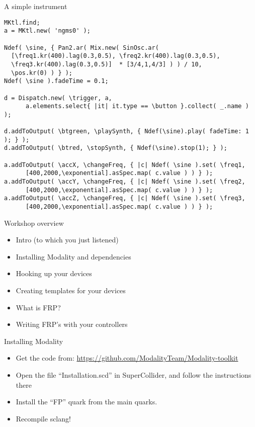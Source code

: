 \documentclass[pdf,slideColor,colorBG,accumulate,total]{prosper}
\begin{document}
\begin{slide}{A simple instrument}
 
 \scriptsize
 \begin{verbatim}
MKtl.find;
a = MKtl.new( 'ngms0' );

Ndef( \sine, { Pan2.ar( Mix.new( SinOsc.ar( 
  [\freq1.kr(400).lag(0.3,0.5), \freq2.kr(400).lag(0.3,0.5), 
  \freq3.kr(400).lag(0.3,0.5)]  * [3/4,1,4/3] ) ) / 10,
  \pos.kr(0) ) } );
Ndef( \sine ).fadeTime = 0.1;

d = Dispatch.new( \trigger, a, 
      a.elements.select{ |it| it.type == \button }.collect( _.name ) );

d.addToOutput( \btgreen, \playSynth, { Ndef(\sine).play( fadeTime: 1 ); } );
d.addToOutput( \btred, \stopSynth, { Ndef(\sine).stop(1); } );

a.addToOutput( \accX, \changeFreq, { |c| Ndef( \sine ).set( \freq1, 
      [400,2000,\exponential].asSpec.map( c.value ) ) } );
a.addToOutput( \accY, \changeFreq, { |c| Ndef( \sine ).set( \freq2, 
      [400,2000,\exponential].asSpec.map( c.value ) ) } );
a.addToOutput( \accZ, \changeFreq, { |c| Ndef( \sine ).set( \freq3, 
      [400,2000,\exponential].asSpec.map( c.value ) ) } );
 \end{verbatim}

\end{slide}

 

\begin{slide}{Workshop overview}
 
 \begin{itemize}
  \item Intro (to which you just listened)
  \item Installing Modality and dependencies
  \item Hooking up your devices
  \item Creating templates for your devices
  \item What is FRP?
  \item Writing FRP's with your controllers
 \end{itemize}
\end{slide}

\begin{slide}{Installing Modality}

\begin{itemize}
 \item Get the code from: \url{https://github.com/ModalityTeam/Modality-toolkit}
 \item Open the file ``Installation.scd'' in SuperCollider, and follow the instructions there
 \item Install the ``FP'' quark from the main quarks.
 \item Recompile sclang!
\end{itemize}
 
\end{slide}
\end{document}

